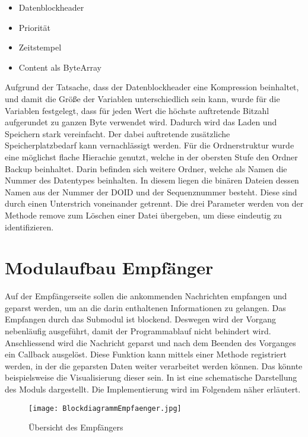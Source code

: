 \begin{itemize}
\item Datenblockheader 
\item Priorität
\item Zeitstempel
\item Content als ByteArray
\end{itemize}

Aufgrund der Tatsache, dass der Datenblockheader eine Kompression beinhaltet,
und damit die Größe der Variablen unterschiedlich sein kann, wurde für die
Variablen festgelegt, dass für jeden Wert die höchste auftretende Bitzahl
aufgerundet zu ganzen Byte verwendet wird. Dadurch wird das Laden und
Speichern stark vereinfacht. Der dabei auftretende zusätzliche
Speicherplatzbedarf kann vernachlässigt werden.
\newline 
Für die Ordnerstruktur wurde eine möglichst flache Hierachie genutzt, welche in
der obersten Stufe den Ordner Backup beinhaltet. Darin befinden sich weitere Ordner, welche
als Namen die Nummer des Datentypes beinhalten. In diesem liegen die binären
Dateien dessen Namen aus der Nummer der DOID und der Sequenznummer besteht.
Diese sind durch einen Unterstrich voneinander getrennt. Die drei Parameter
werden von der Methode remove zum Löschen einer Datei übergeben, um diese
eindeutig zu identifizieren.

\section{Modulaufbau Empfänger}

Auf der Empfängerseite sollen die ankommenden Nachrichten empfangen und geparst
werden, um an die darin enthaltenen Informationen zu gelangen. Das Empfangen
durch das Submodul  ist blockend. Deswegen wird der Vorgang
nebenläufig ausgeführt, damit der Programmablauf nicht behindert wird. Anschliessend wird
die Nachricht geparst und nach dem Beenden des Vorganges ein Callback
 ausgelöst.
Diese Funktion kann mittels einer Methode registriert werden, in der die
geparsten Daten weiter verarbeitet werden können. Das könnte beispielsweise die
Visualisierung dieser sein. \newline
In  ist eine schematische
Darstellung des Moduls dargestellt. Die Implementierung wird im Folgendem näher
erläutert.

\begin{figure}[H]
\centering
\texttt{[image: BlockdiagrammEmpfaenger.jpg]}
\caption{Übersicht des Empfängers}
\label{fig:BlockdiagrammEmpfaenger}
\end{figure}

